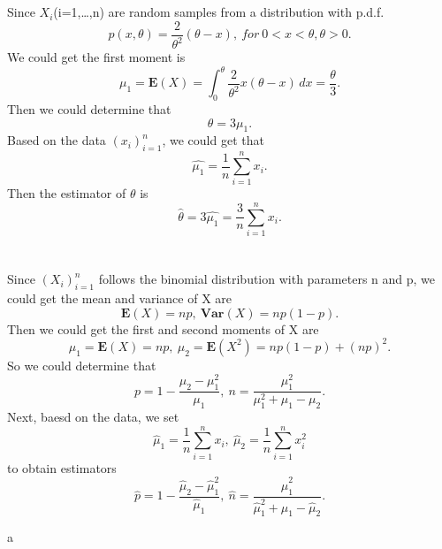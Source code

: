 \documentclass[10.5pt]{article}
\begin{document}
\section{}
Since $X_i$(i=1,\dots,n) are random samples from a distribution with p.d.f. $$p(x,\theta)=\frac{2}{\theta^2}(\theta-x),~for ~0<x<\theta,\theta>0.$$\indent
We could get the first moment is $$\mu_1=\mathbf{E}(X)=\int_0^{\theta}\frac{2}{\theta^2}x(\theta-x)\,dx=\frac{\theta}{3}.$$\indent
Then we could determine that $$\theta=3\mu_1.$$\indent
Based on the data $(x_i)_{i=1}^n$, we could get that $$\hat{\mu_1}=\frac{1}{n}\sum_{i=1}^nx_i.$$\indent
Then the estimator of $\theta$ is $$\hat{\theta}=3\hat{\mu_1}=\frac{3}{n}\sum_{i=1}^nx_i.$$

\section{}
Since $(X_i)_{i=1}^n$ follows the binomial distribution with parameters n and p, we could get the mean and variance of X are $$\mathbf{E}(X)=np,~\mathbf{Var}(X)=np(1-p).$$\indent
Then we could get the first and second moments of X are $$\mu_1=\mathbf{E}(X)=np,~\mu_2=\mathbf{E}(X^2)=np(1-p)+(np)^2.$$\indent
So we could determine that $$p=1-\frac{\mu_2-\mu_1^2}{\mu_1},~n=\frac{\mu_1^2}{\mu_1^2+\mu_1-\mu_2}.$$\indent
Next, baesd on the data, we set $$\hat{\mu}_1=\frac{1}{n}\sum_{i=1}^nx_i,~\hat{\mu}_2=\frac{1}{n}\sum_{i=1}^nx_i^2$$\indent
to obtain estimators $$\hat{p}=1-\frac{\hat{\mu}_2-\hat{\mu}_1^2}{\hat{\mu}_1},~\hat{n}=\frac{\hat{\mu}_1^2}{\hat{\mu}_1^2+\hat{\mu}_1-\hat{\mu}_2}.$$


\newpage
a
\end{document}
